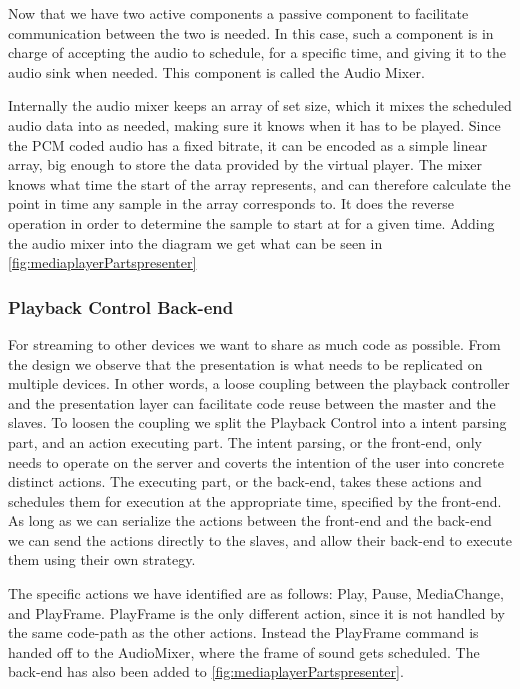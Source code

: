 Now that we have two active components a passive component to
facilitate communication between the two is needed. In this case, such
a component is in charge of accepting the audio to schedule, for
a specific time, and giving it to the audio sink when needed. This
component is called the Audio Mixer.

Internally the audio mixer keeps an array of set size, which it mixes
the scheduled audio data into as needed, making sure it knows when it
has to be played. Since the \ac{PCM} coded audio has a fixed bitrate, it
can be encoded as a simple linear array, big enough to store the data
provided by the virtual player. The mixer knows what time the start of
the array represents, and can therefore calculate the point in time any
sample in the array corresponds to. It does the reverse operation in
order to determine the sample to start at for a given time. Adding the
audio mixer into the diagram we get what can be seen in
\cref{fig:mediaplayerPartspresenter}

\subsubsection{Playback Control Back-end}

For streaming to other devices we want to share as much code as
possible. From the design we observe that the presentation is what needs
to be replicated on multiple devices. In other words, a loose coupling
between the playback controller and the presentation layer can
facilitate code reuse between the master and the slaves. To loosen the
coupling we split the Playback Control into a intent parsing part, and
an action executing part. The intent parsing, or the front-end, only
needs to operate on the server and coverts the intention of the user
into concrete distinct actions. The executing part, or the back-end,
takes these actions and schedules them for execution at the appropriate
time, specified by the front-end. As long as we can serialize the
actions between the front-end and the back-end we can send the actions
directly to the slaves, and allow their back-end to execute them using
their own strategy.

The specific actions we have identified are as follows: Play, Pause,
MediaChange, and PlayFrame. PlayFrame is the only different action, since
it is not handled by the same code-path as the other actions. Instead the
PlayFrame command is handed off to the AudioMixer, where the frame of
sound gets scheduled. The back-end has also been added to
\cref{fig:mediaplayerPartspresenter}.

